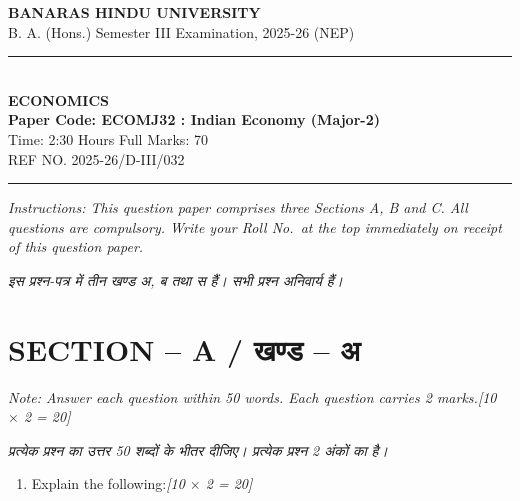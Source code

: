 \documentclass[11pt,a4paper]{article}
\newcommand{\pts}[1]{\hfill \textit{[#1]}}
\begin{document}
\begin{center}
  {\large\bfseries BANARAS HINDU UNIVERSITY}\\[2pt]
  {\normalsize B. A. (Hons.) Semester III Examination, 2025-26 (NEP)}\\[6pt]
  \rule{0.8\linewidth}{0.5pt}\\[6pt]
  {\large\bfseries ECONOMICS}\\[4pt]
  {\large\bfseries Paper Code: ECOMJ32 : Indian Economy (Major-2)}\\[4pt]
  {\normalsize Time: 2:30 Hours \hfill Full Marks: 70}\\[2pt]
  {\small REF NO. 2025-26/D-III/032}
\end{center}
\rule{\linewidth}{0.4pt}
\smallskip

\noindent \textit{Instructions: This question paper comprises three Sections A, B and C. All questions are compulsory. Write your Roll No.\ at the top immediately on receipt of this question paper.}

\smallskip
\noindent \textit{इस प्रश्न-पत्र में तीन खण्ड अ, ब तथा स हैं। सभी प्रश्न अनिवार्य हैं।}

\bigskip

\section*{SECTION -- A / खण्ड -- अ}
\noindent \textit{Note: Answer each question within 50 words. Each question carries 2 marks.}\pts{10 $\times$ 2 = 20}

\noindent \textit{प्रत्येक प्रश्न का उत्तर 50 शब्दों के भीतर दीजिए। प्रत्येक प्रश्न 2 अंकों का है।}

\begin{enumerate}[label=\textbf{\arabic*.},leftmargin=*,itemsep=8pt]
  \item Explain the following:\pts{10 $\times$ 2 = 20}
\end{enumerate}
\end{document}
